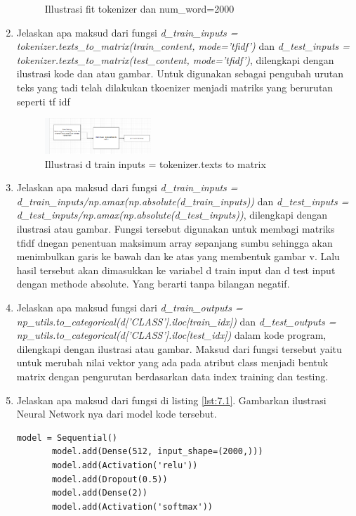\begin{enumerate}
\begin{figure}[H]
    \centering
    \caption{Illustrasi fit tokenizer dan num\_word=2000}
\end{figure}
\item
Jelaskan apa maksud dari fungsi \emph{d\_train\_inputs = tokenizer.texts\_to\_matrix(train\_content, mode='tfidf')} dan \emph{d\_test\_inputs = tokenizer.texts\_to\_matrix(test\_content, mode='tfidf')}, dilengkapi dengan ilustrasi kode dan atau gambar.
Untuk digunakan sebagai pengubah urutan teks yang tadi telah dilakukan tkoenizer menjadi matriks yang berurutan seperti tf idf
\begin{figure}[H]
    \includegraphics[width=4cm]{figures/1174003/7/teori_6.png}
    \centering
    \caption{Illustrasi d train inputs = tokenizer.texts to matrix}
\end{figure}
\item
Jelaskan apa maksud dari fungsi \emph{d\_train\_inputs = d\_train\_inputs/np.amax(np.absolute(d\_train\_inputs))} dan \emph{d\_test\_inputs = d\_test\_inputs/np.amax(np.absolute(d\_test\_inputs))}, dilengkapi dengan ilustrasi atau gambar.
Fungsi tersebut digunakan untuk membagi matriks tfidf dnegan penentuan maksimum array sepanjang sumbu sehingga akan menimbulkan garis ke bawah dan ke atas yang membentuk gambar v. Lalu hasil tersebut akan dimasukkan ke variabel d train input dan d test input dengan methode absolute. Yang berarti tanpa bilangan negatif.
\item
Jelaskan apa maksud fungsi dari \emph{d\_train\_outputs = np\_utils.to\_categorical(d['CLASS'].iloc[train\_idx])} dan \emph{d\_test\_outputs = np\_utils.to\_categorical(d['CLASS'].iloc[test\_idx])} dalam kode program, dilengkapi dengan ilustrasi atau gambar.
Maksud dari fungsi tersebut yaitu untuk merubah nilai vektor yang ada pada atribut class menjadi bentuk matrix dengan pengurutan berdasarkan data index training dan testing.
\item
Jelaskan apa maksud dari fungsi di listing \ref{lst:7.1}. Gambarkan ilustrasi Neural Network nya dari model kode tersebut.
\begin{lstlisting}[caption=Membuat model Neural Network,label={lst:7.1}]
       model = Sequential()
       model.add(Dense(512, input_shape=(2000,)))
       model.add(Activation('relu'))
       model.add(Dropout(0.5))
       model.add(Dense(2))
       model.add(Activation('softmax'))
\end{lstlisting}

\end{enumerate}
